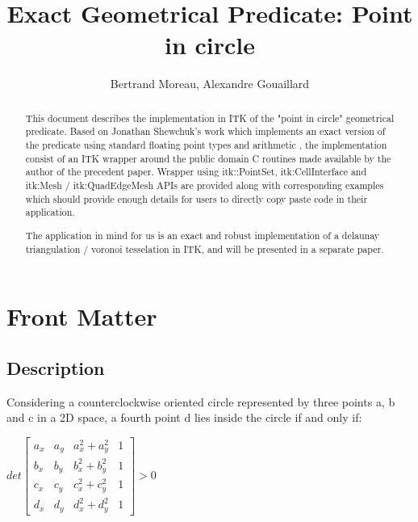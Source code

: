 \documentclass{InsightArticle}
\title{Exact Geometrical Predicate: Point in circle}
\author{Bertrand Moreau, Alexandre Gouaillard}
\newcommand{\IJhandlerIDnumber}{1338}
\begin{document}
\ifpdf
\else
\fi
\maketitle
\ifhtml
\chapter*{Front Matter\label{front}}
\fi

\begin{abstract}
\noindent
This document describes the implementation in ITK of the "point in circle" geometrical predicate.
Based on Jonathan Shewchuk's work which implements an exact version of the predicate using standard
floating point types and arithmetic \cite{shewchuk97a}, the implementation consist of an ITK wrapper around the 
public domain C routines made available by the author of the precedent paper. 
\cite{shewchuk97aurl}
Wrapper using itk::PointSet, itk:CellInterface and itk:Mesh / itk:QuadEdgeMesh APIs are provided
along with corresponding examples which should provide enough details for users to directly
copy paste code in their application.

The application in mind for us is an exact and robust implementation of a delaunay triangulation /
voronoi tesselation in ITK, and will be presented in a separate paper.

\end{abstract}

\IJhandlenote{\IJhandlerIDnumber}
\tableofcontents
\pagebreak

\section{Description}
Considering a counterclockwise oriented circle represented by three points a,
b and c in a 2D space, a fourth point d lies inside the circle if and only if:

\begin{center}
\begin{math}
det
\begin{bmatrix}
a_x & a_y & a_x^2+a_y^2 & 1 \\
b_x & b_y & b_x^2+b_y^2 & 1 \\
c_x & c_y & c_x^2+c_y^2 & 1 \\
d_x & d_y & d_x^2+d_y^2 & 1
\end{bmatrix}
>0
\end{math}
\end{center}
\end{document}
